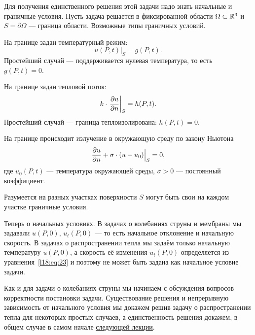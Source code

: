 Для получения единственного решения этой задачи надо знать начальные и граничные условия. Пусть задача решается в фиксированной области $\Omega\subset\mathbb{R}^3$ и $S=\partial\Omega$ --- граница области. Возможные типы граничных условий.
\begin{enumerateD}
	\item На границе задан температурный режим:
	\begin{equation*}
		 u(P,t)\Big|_{S}=g(P,t).
	\end{equation*}
	Простейший случай --- поддерживается нулевая температура, то есть $g(P,t)=0$.
	
	\item На границе задан тепловой поток:
	\begin{equation*}
		 k\cdot\left.\frac{\partial u}{\partial n}\right|_{S}=h(P,t).
	\end{equation*}
	Простейший случай --- граница теплоизолирована: $h(P,t)=0$.
	
	\item На границе происходит излучение в окружающую среду по закону Ньютона
	\begin{equation*}
		 \frac{\partial u}{\partial n}+\sigma\cdot(u-u_0)\Big|_{S}=0,
	\end{equation*}
	где $u_0(P,t)$ --- температура окружающей среды, $\sigma>0$ --- постоянный коэффициент.
\end{enumerateD} 
Разумеется на разных участках поверхности $S$ могут быть свои на каждом участке граничные условия.

Теперь о начальных условиях. В задачах о колебаниях струны и мембраны мы задавали $u(P,0)$, $u_t(P,0)$ --- то есть начальное отклонение и начальную скорость. В задачах о распространении тепла мы задаём только начальную температуру $u(P,0)$, а скорость её изменения $u_t(P,0)$ определяется из уравнения~\eqref{l18:eq:23} и поэтому не может быть задана как начальное условие задачи.

Как и для задачи о колебаниях струны мы начинаем с обсуждения вопросов корректности постановки задачи. Существование решения и непрерывную зависимость от начального условия мы докажем решив задачу о распространении тепла для некоторых простых случаев, а единственность решения докажем, в общем случае в самом начале \hyperref[lecture19]{следующей лекции}. 